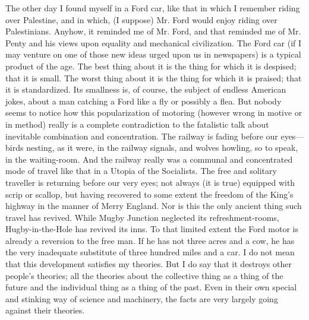 \documentclass{book}
\begin{document}
The other day I found myself in a Ford car, like that in which I remember riding over Palestine, and in which, (I suppose) Mr. Ford would enjoy riding over Palestinians. Anyhow, it reminded me of Mr. Ford, and that reminded me of Mr. Penty and his views upon equality and mechanical civilization. The Ford car (if I may venture on one of those new ideas urged upon us in newspapers) is a typical product of the age. The best thing about it is the thing for which it is despised; that it is small. The worst thing about it is the thing for which it is praised; that it is standardized. Its smallness is, of course, the subject of endless American jokes, about a man catching a Ford like a fly or possibly a flea. But nobody seems to notice how this popularization of motoring (however wrong in motive or in method) really is a complete contradiction to the fatalistic talk about inevitable combination and concentration. The railway is fading before our eyes—birds nesting, as it were, in the railway signals, and wolves howling, so to speak, in the waiting-room. And the railway really was a communal and concentrated mode of travel like that in a Utopia of the Socialists. The free and solitary traveller is returning before our very eyes; not always (it is true) equipped with scrip or scallop, but having recovered to some extent the freedom of the King’s highway in the manner of Merry England. Nor is this the only ancient thing such travel has revived. While Mugby Junction neglected its refreshment-rooms, Hugby-in-the-Hole has revived its inns. To that limited extent the Ford motor is already a reversion to the free man. If he has not three acres and a cow, he has the very inadequate substitute of three hundred miles and a car. I do not mean that this development satisfies my theories. But I do say that it destroys other people’s theories; all the theories about the collective thing as a thing of the future and the individual thing as a thing of the past. Even in their own special and stinking way of science and machinery, the facts are very largely going against their theories.
\end{document}

